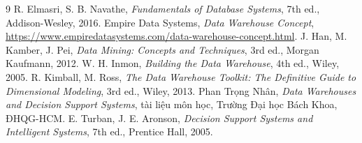 \begin{thebibliography}{9}
 R. Elmasri, S. B. Navathe, \textit{Fundamentals of Database Systems}, 7th ed., Addison-Wesley, 2016.
 Empire Data Systems, \textit{Data Warehouse Concept}, \url{https://www.empiredatasystems.com/data-warehouse-concept.html}.
 J. Han, M. Kamber, J. Pei, \textit{Data Mining: Concepts and Techniques}, 3rd ed., Morgan Kaufmann, 2012.
 W. H. Inmon, \textit{Building the Data Warehouse}, 4th ed., Wiley, 2005.
 R. Kimball, M. Ross, \textit{The Data Warehouse Toolkit: The Definitive Guide to Dimensional Modeling}, 3rd ed., Wiley, 2013.
 Phan Trọng Nhân, \textit{Data Warehouses and Decision Support Systems}, tài liệu môn học, Trường Đại học Bách Khoa, ĐHQG-HCM.
 E. Turban, J. E. Aronson, \textit{Decision Support Systems and Intelligent Systems}, 7th ed., Prentice Hall, 2005.
\end{thebibliography}
